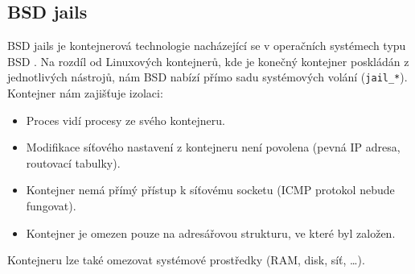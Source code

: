 \subsection{BSD jails}

BSD jails je kontejnerová technologie nacházející se v operačních systémech typu BSD \cite{jails}.
Na rozdíl od Linuxových kontejnerů, kde je konečný kontejner poskládán z jednotlivých nástrojů, nám BSD nabízí přímo sadu systémových volání (\verb|jail_*|).
Kontejner nám zajišťuje izolaci:

\begin{itemize}
	\item Proces vidí procesy ze svého kontejneru.
	\item Modifikace síťového nastavení z kontejneru není povolena (pevná IP adresa, routovací tabulky).
	\item Kontejner nemá přímý přístup k síťovému socketu (ICMP protokol nebude fungovat).
	\item Kontejner je omezen pouze na adresářovou strukturu, ve které byl založen.
\end{itemize}

Kontejneru lze také omezovat systémové prostředky (RAM, disk, síť, \ldots).

